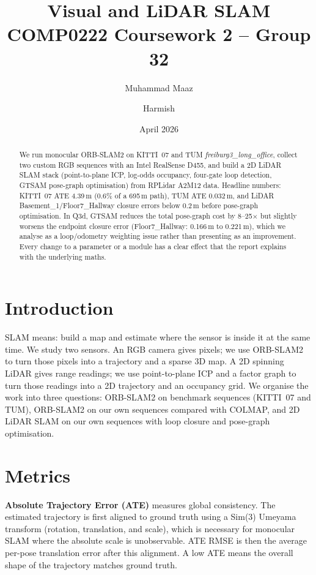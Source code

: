 \documentclass[twocolumn,10pt,a4paper]{article}
\title{\textbf{Visual and LiDAR SLAM}\\
  \large COMP0222 Coursework 2 -- Group 32}
\author{Muhammad Maaz \and Harmish}
\date{April 2026}
\begin{document}
\maketitle

\begin{abstract}
\noindent
We run monocular ORB-SLAM2 on KITTI~07 and TUM
\textit{freiburg3\_long\_office}, collect two custom RGB sequences with an
Intel RealSense D455, and build a 2D LiDAR SLAM stack (point-to-plane ICP,
log-odds occupancy, four-gate loop detection, GTSAM pose-graph
optimisation) from RPLidar A2M12 data. Headline numbers: KITTI~07 ATE
4.39\,m (0.6\% of a 695\,m path), TUM ATE
0.032\,m, and LiDAR Basement\_1/Floor7\_Hallway closure errors
below 0.2\,m before pose-graph optimisation. In Q3d, GTSAM reduces
the total pose-graph cost by 8--25$\times$ but slightly worsens the
endpoint closure error (Floor7\_Hallway: 0.166\,m to 0.221\,m),
which we analyse as a loop/odometry weighting issue rather than
presenting as an improvement. Every change to a parameter or a module
has a clear effect that the report explains with the underlying maths.
\end{abstract}

\section{Introduction}
\label{sec:intro}
SLAM means: build a map and estimate where the sensor is inside it at the
same time. We study two sensors. An RGB camera gives pixels; we use
ORB-SLAM2 to turn those pixels into a trajectory and a sparse 3D map.
A 2D spinning LiDAR gives range readings; we use point-to-plane ICP and a
factor graph to turn those readings into a 2D trajectory and an occupancy
grid. We organise the work into three questions: ORB-SLAM2 on
benchmark sequences (KITTI~07 and TUM), ORB-SLAM2 on our own
sequences compared with COLMAP, and 2D LiDAR SLAM on our own
sequences with loop closure and pose-graph optimisation.

\section{Metrics}
\label{sec:metrics}

\textbf{Absolute Trajectory Error (ATE)} measures global consistency. The estimated trajectory is first aligned to ground truth using a Sim(3) Umeyama transform (rotation, translation, and scale), which is necessary for monocular SLAM where the absolute scale is unobservable. ATE RMSE is then the average per-pose translation error after this alignment. A low ATE means the overall shape of the trajectory matches ground truth.
\end{document}
